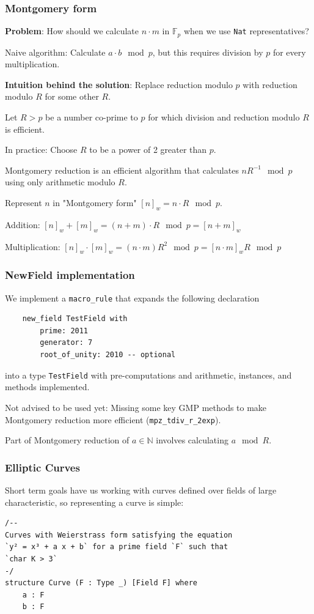 \documentclass[options]{beamer}
\begin{document}
\begin{frame}[fragile]
    \frametitle{Montgomery form}

    {\bf Problem}: How should we calculate $n \cdot m$ in $\mathbb{F}_p$ when we use \verb+Nat+ representatives?

    Naive algorithm: Calculate $a \cdot b \mod p$, but this requires division by $p$ for every multiplication. 

    {\bf Intuition behind the solution}: Replace reduction modulo $p$ with reduction modulo $R$ for some other $R$.

    Let $R > p$ be a number co-prime to $p$ for which division and reduction modulo $R$ is efficient. 

    In practice: Choose $R$ to be a power of 2 greater than $p$.

    Montgomery reduction is an efficient algorithm that calculates $n R^{-1} \mod p$ using only arithmetic modulo $R$.

    Represent $n$ in "Montgomery form" $[n]_w = n \cdot R \mod p$.

    Addition: $[n]_w + [m]_w = (n + m) \cdot R \mod p = [n + m]_w$

    Multiplication: $[n]_w \cdot [m]_w = (n \cdot m) R^2 \mod p = [n \cdot m]_w R \mod p$
\end{frame}

\begin{frame}[fragile]
    \frametitle{NewField implementation}

    We implement a \verb+macro_rule+ that expands the following declaration

    \begin{verbatim}
    new_field TestField with
        prime: 2011
        generator: 7
        root_of_unity: 2010 -- optional
    \end{verbatim}

    into a type \verb+TestField+ with pre-computations and arithmetic, instances, and methods implemented. 

    Not advised to be used yet: Missing some key GMP methods to make Montgomery reduction more efficient
    (\verb+mpz_tdiv_r_2exp+).

    Part of Montgomery reduction of $a \in \mathbb N$ involves calculating $a \mod R$. 

\end{frame}
\begin{frame}[fragile]
    \frametitle{Elliptic Curves}

    Short term goals have us working with curves defined over fields of large characteristic, so representing a curve is simple:

    \begin{verbatim}
/--
Curves with Weierstrass form satisfying the equation 
`y² = x³ + a x + b` for a prime field `F` such that 
`char K > 3`
-/
structure Curve (F : Type _) [Field F] where
    a : F
    b : F
    \end{verbatim}

\end{frame}
\end{document}
